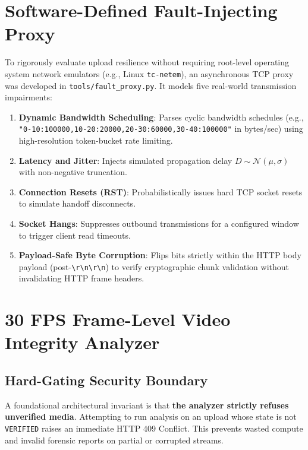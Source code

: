 \documentclass[11pt,a4paper]{article}
\begin{document}
\section{Software-Defined Fault-Injecting Proxy}

To rigorously evaluate upload resilience without requiring root-level operating system network emulators (e.g., Linux \texttt{tc-netem}), an asynchronous TCP proxy was developed in \texttt{tools/fault\_proxy.py}. It models five real-world transmission impairments:

\begin{enumerate}[leftmargin=*,itemsep=1pt]
    \item \textbf{Dynamic Bandwidth Scheduling}: Parses cyclic bandwidth schedules (e.g., \texttt{"0-10:100000,10-20:20000,20-30:60000,30-40:100000"} in bytes/sec) using high-resolution token-bucket rate limiting.
    \item \textbf{Latency and Jitter}: Injects simulated propagation delay $D \sim \mathcal{N}(\mu, \sigma)$ with non-negative truncation.
    \item \textbf{Connection Resets (RST)}: Probabilistically issues hard TCP socket resets to simulate handoff disconnects.
    \item \textbf{Socket Hangs}: Suppresses outbound transmissions for a configured window to trigger client read timeouts.
    \item \textbf{Payload-Safe Byte Corruption}: Flips bits strictly within the HTTP body payload (post-\texttt{\textbackslash r\textbackslash n\textbackslash r\textbackslash n}) to verify cryptographic chunk validation without invalidating HTTP frame headers.
\end{enumerate}

\section{30 FPS Frame-Level Video Integrity Analyzer}

\subsection{Hard-Gating Security Boundary}
A foundational architectural invariant is that \textbf{the analyzer strictly refuses unverified media}. Attempting to run analysis on an upload whose state is not \texttt{VERIFIED} raises an immediate HTTP 409 Conflict. This prevents wasted compute and invalid forensic reports on partial or corrupted streams.
\end{document}
